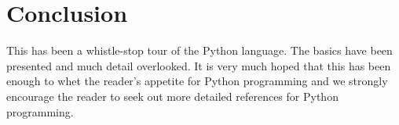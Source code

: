 \section{Conclusion}

This has been a whistle-stop tour of the Python language. The basics
have been presented and much detail overlooked. It is very much hoped
that this has been enough to whet the reader's appetite for Python
programming and we strongly encourage the reader to seek out more
detailed references for Python programming.

